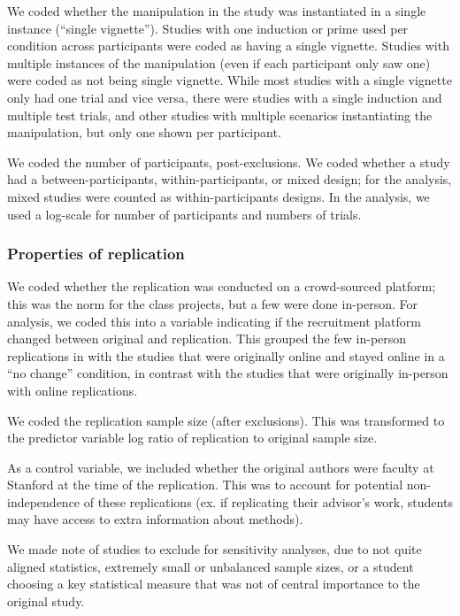 \documentclass[
  english,
  a4paper,
]{article}
\begin{document}
We coded whether the manipulation in the study was instantiated in a single instance (``single vignette''). Studies with one induction or prime used per condition across participants were coded as having a single vignette. Studies with multiple instances of the manipulation (even if each participant only saw one) were coded as not being single vignette. While most studies with a single vignette only had one trial and vice versa, there were studies with a single induction and multiple test trials, and other studies with multiple scenarios instantiating the manipulation, but only one shown per participant.

We coded the number of participants, post-exclusions. We coded whether a study had a between-participants, within-participants, or mixed design; for the analysis, mixed studies were counted as within-participants designs. In the analysis, we used a log-scale for number of participants and numbers of trials.

\hypertarget{properties-of-replication}{%
\subsubsection{Properties of replication}\label{properties-of-replication}}

We coded whether the replication was conducted on a crowd-sourced platform; this was the norm for the class projects, but a few were done in-person. For analysis, we coded this into a variable indicating if the recruitment platform changed between original and replication. This grouped the few in-person replications in with the studies that were originally online and stayed online in a ``no change'' condition, in contrast with the studies that were originally in-person with online replications.

We coded the replication sample size (after exclusions). This was transformed to the predictor variable log ratio of replication to original sample size.

As a control variable, we included whether the original authors were faculty at Stanford at the time of the replication. This was to account for potential non-independence of these replications (ex. if replicating their advisor's work, students may have access to extra information about methods).

We made note of studies to exclude for sensitivity analyses, due to not quite aligned statistics, extremely small or unbalanced sample sizes, or a student choosing a key statistical measure that was not of central importance to the original study.
\end{document}
